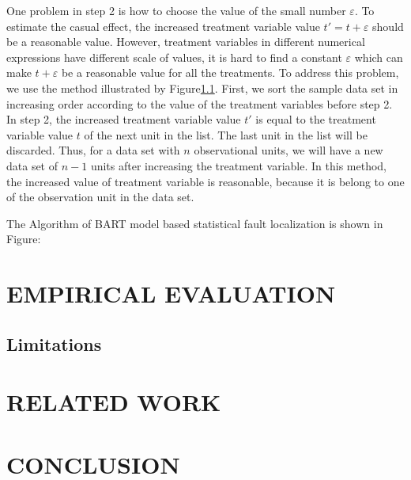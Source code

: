 One problem in step 2 is how to choose the value of the small number $\varepsilon $. To estimate the casual effect, the increased treatment variable value $t'=t+\varepsilon$ should be a reasonable value. However, treatment variables in different numerical expressions have different scale of values, it is hard to find a constant $\varepsilon$ which can make $t+\varepsilon$ be a reasonable value for all the treatments. To address this problem, we use the method illustrated by Figure\ref{}. First, we sort the sample data set in increasing order according to the value of the treatment variables before step 2. In step 2, the increased treatment variable value $t'$ is equal to the treatment variable value $t$ of the next unit in the list.  The last unit in the list will be discarded. Thus, for a data set with $n$ observational units, we will have a new data set of $n-1$ units after increasing the treatment variable.  In this method, the increased value of treatment variable is reasonable, because it is belong to one of the observation unit in the data set.

The Algorithm of BART model based statistical fault localization is shown in Figure: 



\section{EMPIRICAL EVALUATION}\label{evaluation}%


\subsection{Limitations}


\section{RELATED WORK}\label{relatedwork}


\section{CONCLUSION}\label{conclusion}
